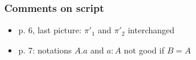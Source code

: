\documentclass[handout]{beamer}
\begin{document}
\frame
  {   
    \frametitle{Comments on script}\label{Ch3:comments}

 \begin{itemize}[<+->]
\item p. 6, last picture: $\pi'_1$ and  $\pi'_2$ interchanged
\item p. 7: notations $A.a$ and $a:A$ not good if $B=A$
 \end{itemize}

 }
\end{document}
